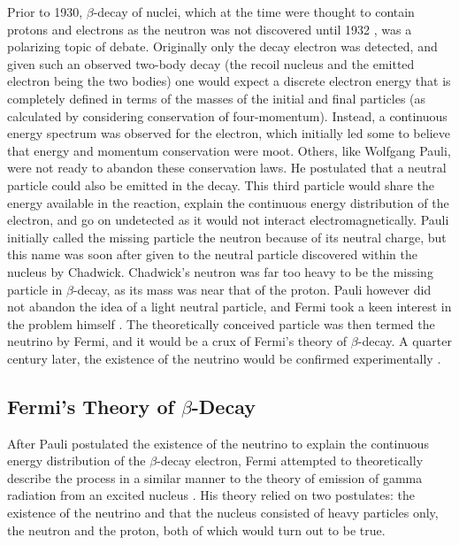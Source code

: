 Prior to 1930, $\beta$-decay of nuclei, which at the time were thought to contain protons
and electrons as the neutron was not discovered until 1932 \cite{chadwick1932}, was a polarizing topic of debate. Originally
only the decay electron was detected, and given such an observed two-body decay (the recoil
nucleus and the emitted electron being the two bodies) one would expect a discrete
electron energy that is completely defined in terms of the masses of the initial and
final particles (as calculated by considering conservation of four-momentum).
Instead, a continuous energy spectrum was observed for the electron, which
initially led some to believe that energy and momentum conservation were moot. Others, like
Wolfgang Pauli, were not ready
to abandon these conservation laws. He postulated that a neutral particle
could also be emitted in the decay. This third particle would share the energy available
in the reaction, explain the continuous energy distribution of the electron, and go
on undetected as it would not interact electromagnetically.
Pauli initially called the missing particle the neutron because of its neutral charge, but this name
was soon after given to the neutral particle discovered within the nucleus by Chadwick. Chadwick's
neutron was far too heavy
to be the missing particle in $\beta$-decay, as its mass was near that of the proton.
Pauli however did not abandon the idea of a light neutral particle, and Fermi took a keen
interest in the problem himself \cite{pauli1994writings}. The theoretically conceived particle was then termed
the neutrino by Fermi, and it would be a crux of Fermi's theory of $\beta$-decay.
A quarter century later, the existence of the neutrino would be confirmed
experimentally \cite{cowan1956detection}.

\subsection{Fermi's Theory of $\beta$-Decay}
After Pauli postulated the existence of the neutrino to explain the continuous energy
distribution of the $\beta$-decay electron, Fermi attempted to theoretically describe
the process in a similar manner to the theory of emission of
gamma radiation from an excited nucleus \cite{fermi1934,wilson1968fermi}.
His theory relied on two postulates: the existence of the neutrino and that the nucleus consisted
of heavy particles only, the neutron and the proton, both of which would turn out to be true.

